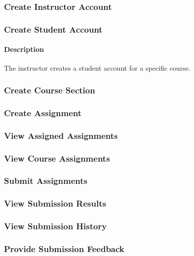 \documentclass{article}
\begin{document}
\subsubsection{Create Instructor Account}

\subsubsection{Create Student Account}

\paragraph{Description} The instructor creates a student account for a specific course.


\subsubsection{Create Course Section}

\subsubsection{Create Assignment}


\subsubsection{View Assigned Assignments}

\subsubsection{View Course Assignments}


\subsubsection{Submit Assignments}


\subsubsection{View Submission Results}

\subsubsection{View Submission History}

\subsubsection{Provide Submission Feedback}
\end{document}
